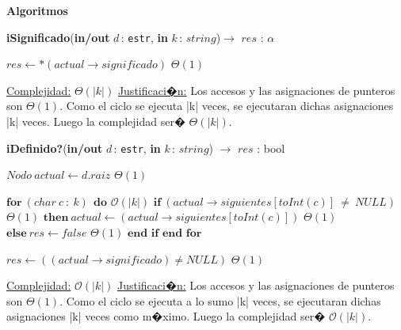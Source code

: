 \documentclass[a4paper,10pt]{article}
\let\TipoVariable=\texttt
\let\ModificadorArgumento=\textbf
\newcommand{\tab}{\hspace*{7mm}}
\newcommand{\ttab}{\tab \tab}
\newcommand{\In}[2]{\ModificadorArgumento{in} \ensuremath{#1}\,: \TipoVariable{#2}\xspace}
\newcommand{\Inout}[2]{\ModificadorArgumento{in/out} \ensuremath{#1}\,: \TipoVariable{#2}\xspace}
\newenvironment{Algoritmos}{%
  \vspace*{2ex}%
  \noindent\textbf{\Large Algoritmos}%
  \vspace*{2ex}%
}{}
\newcommand{\DRef}{\ensuremath{\rightarrow}}
\newcommand{\BigO}{\ensuremath{\mathcal{O}}}
\begin{document}
{\begin{Algoritmos}
\begin{algorithm}[H]{\textbf{iSignificado}(\Inout{d}{estr}, \In{k}{$string$})$\to$ $res$ : $\alpha$}
\begin{algorithmic}[1]
        \State $res \gets *(actual \DRef significado)$                                            \Comment $\Theta(1)$

          \medskip
          \Statex \underline{Complejidad:} $\Theta(|k|)$
          \Statex \underline{Justificaci�n:} Los accesos y las asignaciones de punteros son $\Theta(1)$. Como el ciclo se ejecuta |k| veces, se ejecutaran dichas asignaciones |k| veces. Luego la complejidad ser� $\Theta(|k|)$.
          \end{algorithmic}
    \end{algorithm}


    \begin{algorithm}[H]{\textbf{iDefinido?}(\Inout{d}{estr}, \In{k}{$string$}) $\to$ $res$ : bool}
      \begin{algorithmic}[1]
           \State $Nodo \ actual \gets d.raiz$                                                      \Comment $\Theta(1)$

           \State $\textbf{for} \ (char \ c \ : \ k) \ \ \textbf{do}$                               \Comment $\BigO(|k|)$  
           \State \tab  $\textbf{if} \ (actual \DRef siguientes [toInt(c)] \ \neq  \ NULL) $        \Comment $\Theta(1)$
           \State \ttab   $\textbf{then} \ actual \gets (actual \DRef siguientes [toInt(c)])$       \Comment $\Theta(1)$
           \State \ttab  $\textbf{else} \ res \gets false$                                           \Comment $\Theta(1)$
           \State \tab $\textbf{end if}$
           \State $\textbf{end for}$                                    

           \State $res \gets ((actual \DRef significado) \neq NULL)$                                                                  \Comment $\Theta(1)$

          \medskip
          \Statex \underline{Complejidad:} $\BigO(|k|)$
          \Statex \underline{Justificaci�n:} Los accesos y las asignaciones de punteros son $\Theta(1)$. Como el ciclo se ejecuta a lo sumo |k| veces, se ejecutaran dichas asignaciones |k| veces como m�ximo. Luego la complejidad ser� $\BigO(|k|)$.
          \end{algorithmic}
    \end{algorithm}


\end{Algoritmos}}
\end{document}
